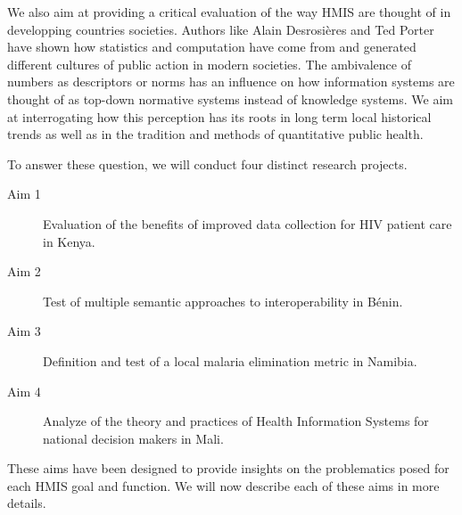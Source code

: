 We also aim at providing a critical evaluation of the way HMIS are thought of in developping countries societies. Authors like Alain Desrosières and Ted Porter have shown how statistics and computation have come from and generated different cultures of public action in modern societies. The ambivalence of numbers as descriptors or norms has an influence on how information systems are thought of as top-down normative systems instead of knowledge systems. We aim at interrogating how this perception has its roots in long term local historical trends as well as in the tradition and methods of quantitative public health.

To answer these question, we will conduct four distinct research projects.
\begin{description}
    \item[Aim 1] Evaluation of the benefits of improved data collection for HIV patient care in Kenya.
    \item[Aim 2] Test of multiple semantic approaches to interoperability in Bénin.
    \item[Aim 3] Definition and test of a local malaria elimination metric in Namibia.
    \item[Aim 4] Analyze of the theory and practices of Health Information Systems for national decision makers in Mali.
\end{description}

These aims have been designed to provide insights on the problematics posed for each HMIS goal and function. We will now describe each of these aims in more details.
